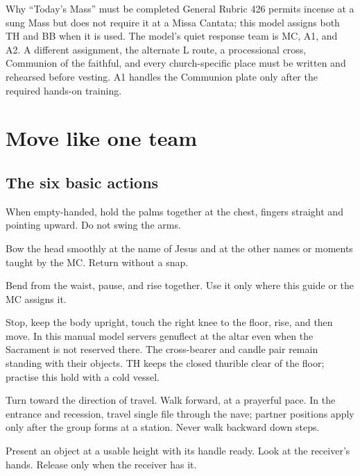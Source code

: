 \begin{watchbox}{Why ``Today's Mass'' must be completed}
General Rubric 426 permits incense at a sung Mass but does not require it at a
Missa Cantata; this model assigns both TH and BB when it is used. The model's
quiet response team is MC, A1, and A2. A different assignment, the alternate L
route, a processional cross, Communion of the faithful, and every church-specific
place must be written and rehearsed before vesting. A1 handles the Communion
plate only after the required hands-on training.
\end{watchbox}

\section{Move like one team}

\subsection{The six basic actions}

\begin{description}[style=multiline,leftmargin=0.25\linewidth,labelwidth=0.22\linewidth]
  \item[Hands joined.] When empty-handed, hold the palms together at the chest,
  fingers straight and pointing upward. Do not swing the arms.
  \item[Head bow.] Bow the head smoothly at the name of Jesus and at the other
  names or moments taught by the MC. Return without a snap.
  \item[Body bow.] Bend from the waist, pause, and rise together. Use it only
  where this guide or the MC assigns it.
  \item[Genuflection.] Stop, keep the body upright, touch the right knee to the
  floor, rise, and then move. In this manual model servers genuflect at the
  altar even when the Sacrament is not reserved there. The cross-bearer and
  candle pair remain standing with their objects. TH keeps the closed thurible
  clear of the floor; practise this hold with a cold vessel.
  \item[Turn and walk.] Turn toward the direction of travel. Walk forward,
  at a prayerful pace. In the entrance and recession, travel single file
  through the nave; partner positions apply only after the group forms at a
  station. Never walk backward down steps.
  \item[Give and receive.] Present an object at a usable height with its handle
  ready. Look at the receiver's hands. Release only when the receiver has it.
\end{description}

